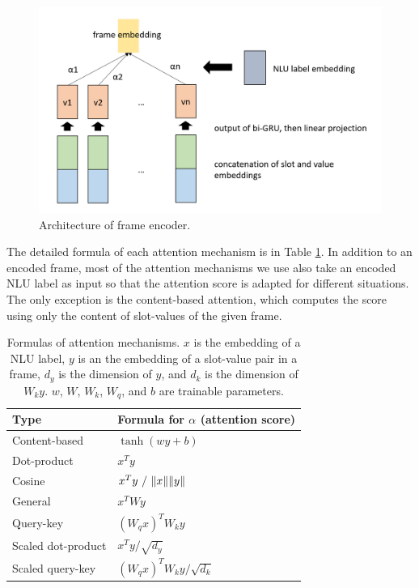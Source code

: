 \begin{figure}
    \centering
    \includegraphics[width=\columnwidth]{figures/frames.png}
    \caption[Frame encoder]{Architecture of frame encoder.}
    \label{fig:frame}
\end{figure}

The detailed formula of each attention mechanism is in Table \ref{tab:att}. In addition to an encoded frame, most of the attention mechanisms we use also take an encoded NLU label as input so that the attention score is adapted for different situations. The only exception is the content-based attention, which computes the score using only the content of slot-values of the given frame.


\begin{table}
    \caption[Formulas of attention mechanisms]{Formulas of attention mechanisms. $x$ is the embedding of a NLU label, $y$ is an the embedding of a slot-value pair in a frame, $d_y$ is the dimension of $y$, and $d_k$ is the dimension of $W_ky$. $w$, $W$, $W_k$, $W_q$, and $b$ are trainable parameters.}
    \label{tab:att}
    \centering
    \begin{tabular}{ll}
        \toprule
        Type & Formula for $\alpha$ (attention score) \\
        \midrule
        Content-based & $\tanh(wy+b)$ \\
        Dot-product & $x^Ty$ \\
        Cosine & $x^Ty\ /\ \norm{x}\norm{y}$ \\
        General & $x^TWy$ \\
        Query-key & $(W_qx)^TW_ky$ \\
        Scaled dot-product & $x^Ty / \sqrt{d_y}$ \\
        Scaled query-key & $(W_qx)^TW_ky / \sqrt{d_k}$ \\
        \bottomrule
    \end{tabular}
\end{table}
